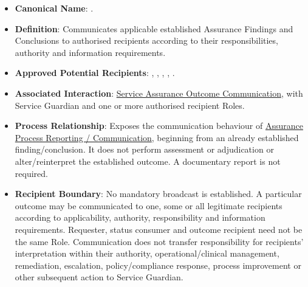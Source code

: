\begin{itemize}

\item
\textbf{Canonical Name}: \texttt{}.



\item
\textbf{Definition}: Communicates applicable established Assurance Findings and Conclusions to authorised recipients according to their responsibilities, authority and information requirements.



\item
\textbf{Approved Potential Recipients}: \texttt{}, \texttt{}, \texttt{}, \texttt{}, \texttt{}.



\item
\textbf{Associated Interaction}: \href{https://github.com/fhirfactory/harmonia/blob/98410db60155198a75f74c79d98060070209faa1/docs/markdown/03-business-architecture/collaborations-interactions/interactions.md\#service-assurance-outcome-communication}{Service Assurance Outcome Communication}, with Service Guardian and one or more authorised recipient Roles.



\item
\textbf{Process Relationship}: Exposes the communication behaviour of \href{https://github.com/fhirfactory/harmonia/blob/98410db60155198a75f74c79d98060070209faa1/docs/markdown/03-business-architecture/processes/business-processes.md\#assurance-process-reporting-communication}{Assurance Process Reporting /\allowbreak{} Communication}, beginning from an already established finding/\allowbreak{}conclusion. It does not perform assessment or adjudication or alter/\allowbreak{}reinterpret the established outcome. A documentary report is not required.



\item
\textbf{Recipient Boundary}: No mandatory broadcast is established. A particular outcome may be communicated to one, some or all legitimate recipients according to applicability, authority, responsibility and information requirements. Requester, status consumer and outcome recipient need not be the same Role. Communication does not transfer responsibility for recipients' interpretation within their authority, operational/\allowbreak{}clinical management, remediation, escalation, policy/\allowbreak{}compliance response, process improvement or other subsequent action to Service Guardian.



\end{itemize}
\label{rad:assurance:198}
